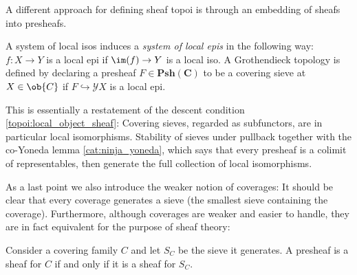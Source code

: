     A different approach for defining sheaf topoi is through an embedding of sheafs into presheafs.
    \begin{property}
        A system of local isos induces a \textit{system of local epis} in the following way: $f:X\rightarrow Y$ is a local epi if $\im(f)\rightarrow Y$ is a local iso. A Grothendieck topology is defined by declaring a presheaf $F\in\mathbf{Psh}(\mathbf{C})$ to be a covering sieve at $X\in\ob{C}$ if $F\hookrightarrow\mathcal{Y}X$ is a local epi.
    \end{property}

    \begin{remark}
        This is essentially a restatement of the descent condition \ref{topoi:local_object_sheaf}: Covering sieves, regarded as subfunctors, are in particular local isomorphisms. Stability of sieves under pullback together with the co-Yoneda lemma \ref{cat:ninja_yoneda}, which says that every presheaf is a colimit of representables, then generate the full collection of local isomorphisms.
    \end{remark}

    As a last point we also introduce the weaker notion of coverages:
    It should be clear that every coverage generates a sieve (the smallest sieve containing the coverage). Furthermore, although coverages are weaker and easier to handle, they are in fact equivalent for the purpose of sheaf theory:
    \begin{property}
        Consider a covering family $C$ and let $S_C$ be the sieve it generates. A presheaf is a sheaf for $C$ if and only if it is a sheaf for $S_C$.
    \end{property}

